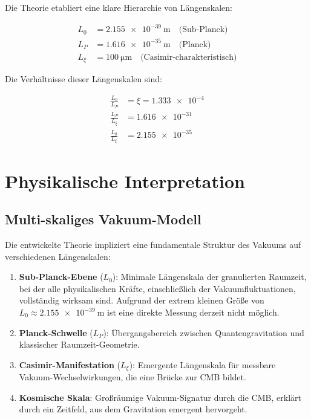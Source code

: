 	Die Theorie etabliert eine klare Hierarchie von Längenskalen:
	
	\begin{align}
		L_0 &= \SI{2.155e-39}{\meter} \quad \text{(Sub-Planck)} \label{eq:L0_value}\\
		L_P &= \SI{1.616e-35}{\meter} \quad \text{(Planck)} \label{eq:LP_value}\\
		L_\xi &= \SI{100}{\micro\meter} \quad \text{(Casimir-charakteristisch)} \label{eq:Lxi_value}
	\end{align}
	
	Die Verhältnisse dieser Längenskalen sind:
	
	\begin{align}
		\frac{L_0}{L_P} &= \xi = \num{1.333e-4} \label{eq:L0_LP_ratio}\\
		\frac{L_P}{L_\xi} &= \num{1.616e-31} \label{eq:LP_Lxi_ratio}\\
		\frac{L_0}{L_\xi} &= \num{2.155e-35} \label{eq:L0_Lxi_ratio}
	\end{align}
	
	\section{Physikalische Interpretation}
	
	\subsection{Multi-skaliges Vakuum-Modell}
	
	Die entwickelte Theorie impliziert eine fundamentale Struktur des Vakuums auf verschiedenen Längenskalen:
	
	\begin{enumerate}
		\item \textbf{Sub-Planck-Ebene} (\( L_0 \)): Minimale Längenskala der granulierten Raumzeit, bei der alle physikalischen Kräfte, einschließlich der Vakuumfluktuationen, vollständig wirksam sind. Aufgrund der extrem kleinen Größe von \( L_0 \approx \SI{2.155e-39}{\meter} \) ist eine direkte Messung derzeit nicht möglich.
		\item \textbf{Planck-Schwelle} (\( L_P \)): Übergangsbereich zwischen Quantengravitation und klassischer Raumzeit-Geometrie.
		\item \textbf{Casimir-Manifestation} (\( L_\xi \)): Emergente Längenskala für messbare Vakuum-Wechselwirkungen, die eine Brücke zur CMB bildet.
		\item \textbf{Kosmische Skala}: Großräumige Vakuum-Signatur durch die CMB, erklärt durch ein Zeitfeld, aus dem Gravitation emergent hervorgeht.
	\end{enumerate}
	
